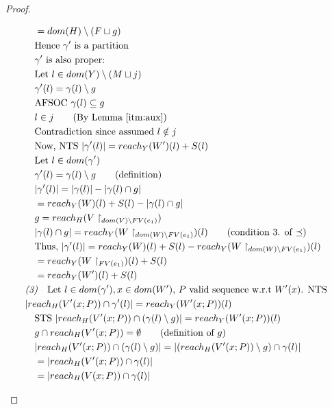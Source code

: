 \documentclass{easychair}
\theoremstyle{definition}
\begin{document}
\begin{proof}
\begin{description}
\begin{align*}
		&\quad = dom(H) \setminus (F \sqcup g)\\
		&\quad \text{Hence } \gamma' \text{ is a partition}\\
		&\quad \gamma' \text{ is also proper: }\\
		&\quad \text{Let } l \in dom(Y) \setminus (M \sqcup j)\\
		&\quad \gamma'(l) = \gamma(l) \setminus g\\
		&\quad \text{AFSOC } \gamma(l) \subseteq g\\ 
		&\quad l \in j \tag{By Lemma \ref{itm:aux}}\\
		&\quad \text{Contradiction since assumed } l \notin j\\ 
		&\quad \text{Now, NTS } |\gamma'(l)| = reach_{Y}(W')(l) + S(l)\\
		&\quad \text{Let } l \in dom(\gamma')\\
		&\quad \gamma'(l) = \gamma(l) \setminus g \tag{definition}\\ 
		&\quad |\gamma'(l)| = |\gamma(l)| - |\gamma(l) \cap g|\\
		&\quad = reach_Y(W)(l) + S(l) - |\gamma(l) \cap g|\\
		&\quad g = reach_H(V\restriction_{dom(V) \setminus FV(e_1)})\\
		&\quad |\gamma(l) \cap g| = reach_Y(W\restriction_{dom(W)\setminus FV(e_1)})(l) 
			\tag{condition 3. of $\preceq$}\\
		&\quad \text{Thus, } |\gamma'(l)| = 
			reach_Y(W)(l) + S(l) - reach_Y(W\restriction_{dom(W)\setminus FV(e_1)})(l)\\
		&\quad = reach_Y(W\restriction_{FV(e_1)})(l) +  S(l)\\
		&\quad = reach_Y(W')(l) +  S(l)\\
		&\emph{(3)}\quad \text{Let $l \in dom(\gamma'), x \in dom(W')$, 
			$P$ valid sequence w.r.t $W'(x)$. NTS }\\ 
		&|reach_{H}(V'(x;P)) \cap \gamma'(l)| = reach_{Y}(W'(x;P))(l)\\ 
		&\quad \text{STS } |reach_{H}(V'(x;P)) \cap (\gamma(l) \setminus g)| = reach_{Y}(W'(x;P))(l) \\
		&\quad g \cap reach_H(V'(x;P)) = \emptyset \tag{definition of $g$}\\
		&\quad |reach_{H}(V'(x;P)) \cap (\gamma(l) \setminus g)| = 
				|(reach_{H}(V'(x;P)) \setminus g) \cap \gamma(l)|\\
		&\quad = |reach_{H}(V'(x;P)) \cap \gamma(l)|\\
		&\quad = |reach_{H}(V(x;P)) \cap \gamma(l)|\\

\end{align*}
\end{description}
\end{proof}
\end{document}
